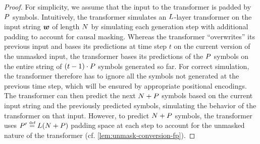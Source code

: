 \MDMsCoTChain*
\begin{proof} 
   For simplicity, we assume that the input to the \pCoTAcr transformer is padded by ${P}$ symbols.
   Intuitively, the \pCoTAcr transformer simulates an ${{L}}$-layer \eMDMAcr transformer on the input string ${{\boldsymbol{w}}}$ of length ${{N}}$ by simulating each \eMDMAcr generation step with additional padding to account for causal masking.
   Whereas the \eMDMAcr transformer ``overwrites'' its previous input and bases its predictions at time step $t$ on the current version of the unmasked input, the \pCoTAcr transformer bases its predictions of the ${P}$ symbols on the entire string of $(t - 1) \cdot {P}$ symbols generated so far.
   For correct simulation, the \pCoTAcr transformer therefore has to ignore all the symbols not generated at the previous time step, which will be ensured by appropriate positional encodings. 
   The \pCoTAcr transformer can then predict the next ${{N}} + {P}$ symbols based on the current input string and the previously predicted symbols, simulating the behavior of the \eMDMAcr transformer on that input.
   However, to predict ${{N}} + {P}$ symbols, the \pCoTAcr transformer uses ${P}' \mathrel{\stackrel{\textnormal{\tiny def}}{=}} {{L}} ({{N}} + {P})$ padding space at each step to account for the unmasked nature of the \eMDMAcr transformer (cf. \cref{lem:unmask-conversion-fp}).
   

\end{proof}
